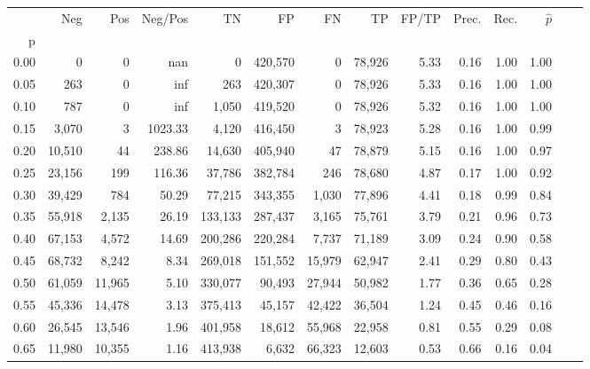\begin{tabular}{rrrrrrrrrrrrrr}
\toprule
{} &     Neg &     Pos &  Neg/Pos &       TN &       FP &      FN &      TP & FP/TP & Prec. &  Rec. & $\hat{p}$ \\
p    &         &         &          &          &          &         &         &       &       &       &           \\
\midrule
0.00 &       0 &       0 &      nan &        0 &  420,570 &       0 &  78,926 &  5.33 &  0.16 &  1.00 &      1.00 \\
0.05 &     263 &       0 &      inf &      263 &  420,307 &       0 &  78,926 &  5.33 &  0.16 &  1.00 &      1.00 \\
0.10 &     787 &       0 &      inf &    1,050 &  419,520 &       0 &  78,926 &  5.32 &  0.16 &  1.00 &      1.00 \\
0.15 &   3,070 &       3 &  1023.33 &    4,120 &  416,450 &       3 &  78,923 &  5.28 &  0.16 &  1.00 &      0.99 \\
0.20 &  10,510 &      44 &   238.86 &   14,630 &  405,940 &      47 &  78,879 &  5.15 &  0.16 &  1.00 &      0.97 \\
0.25 &  23,156 &     199 &   116.36 &   37,786 &  382,784 &     246 &  78,680 &  4.87 &  0.17 &  1.00 &      0.92 \\
0.30 &  39,429 &     784 &    50.29 &   77,215 &  343,355 &   1,030 &  77,896 &  4.41 &  0.18 &  0.99 &      0.84 \\
0.35 &  55,918 &   2,135 &    26.19 &  133,133 &  287,437 &   3,165 &  75,761 &  3.79 &  0.21 &  0.96 &      0.73 \\
0.40 &  67,153 &   4,572 &    14.69 &  200,286 &  220,284 &   7,737 &  71,189 &  3.09 &  0.24 &  0.90 &      0.58 \\
0.45 &  68,732 &   8,242 &     8.34 &  269,018 &  151,552 &  15,979 &  62,947 &  2.41 &  0.29 &  0.80 &      0.43 \\
0.50 &  61,059 &  11,965 &     5.10 &  330,077 &   90,493 &  27,944 &  50,982 &  1.77 &  0.36 &  0.65 &      0.28 \\
0.55 &  45,336 &  14,478 &     3.13 &  375,413 &   45,157 &  42,422 &  36,504 &  1.24 &  0.45 &  0.46 &      0.16 \\
0.60 &  26,545 &  13,546 &     1.96 &  401,958 &   18,612 &  55,968 &  22,958 &  0.81 &  0.55 &  0.29 &      0.08 \\
0.65 &  11,980 &  10,355 &     1.16 &  413,938 &    6,632 &  66,323 &  12,603 &  0.53 &  0.66 &  0.16 &      0.04 \\

\end{tabular}
